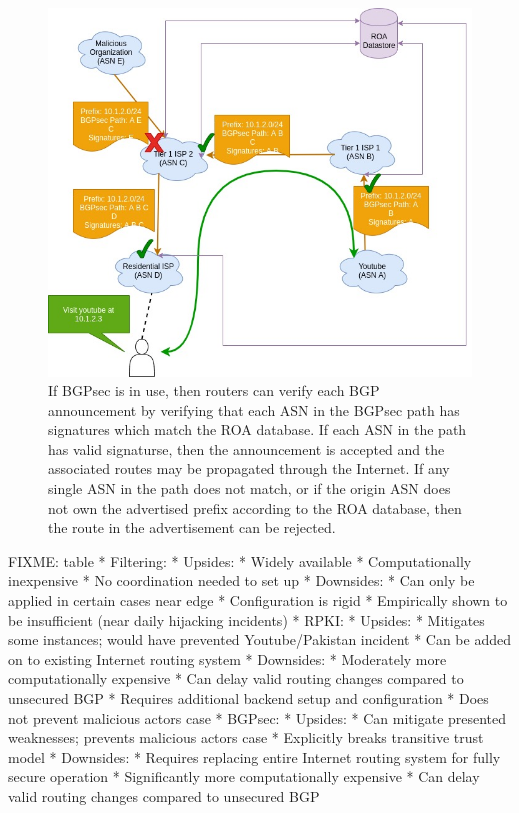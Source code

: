 \documentclass[conference]{IEEEtran}
\begin{document}
\begin{figure}
  \includegraphics[width=\linewidth]{images/bgpsec-ops.jpg}
  \caption{If BGPsec is in use, then routers can verify each BGP announcement by verifying that each ASN in the BGPsec path has signatures which match the ROA database.  If each ASN in the path has valid signaturse, then the announcement is accepted and the associated routes may be propagated through the Internet.  If any single ASN in the path does not match, or if the origin ASN does not own the advertised prefix according to the ROA database, then the route in the advertisement can be rejected.}
  \label{fig:bgpsec-ops}
\end{figure}

FIXME: table
 * Filtering:
  * Upsides:
   * Widely available
   * Computationally inexpensive
   * No coordination needed to set up
  * Downsides:
   * Can only be applied in certain cases near edge
   * Configuration is rigid
   * Empirically shown to be insufficient (near daily hijacking incidents)
 * RPKI:
  * Upsides:
   * Mitigates some instances; would have prevented Youtube/Pakistan incident
   * Can be added on to existing Internet routing system
  * Downsides:
   * Moderately more computationally expensive
   * Can delay valid routing changes compared to unsecured BGP
   * Requires additional backend setup and configuration
   * Does not prevent malicious actors case
 * BGPsec:
  * Upsides:
   * Can mitigate presented weaknesses; prevents malicious actors case
   * Explicitly breaks transitive trust model 
  * Downsides:
   * Requires replacing entire Internet routing system for fully secure operation
   * Significantly more computationally expensive
   * Can delay valid routing changes compared to unsecured BGP
\end{document}
